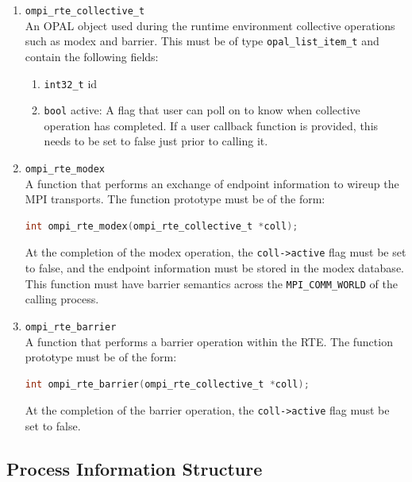 \begin{enumerate}
\item \verb|ompi_rte_collective_t|\\
  An OPAL object used during the runtime environment collective operations such as modex and barrier. This must be of type \verb|opal_list_item_t| and contain the following fields:
  
  \begin{enumerate}
  \item \verb|int32_t| id
  \item \verb|bool| active: A flag that user can poll on to know when collective operation has completed. If a user callback function is provided, this needs to be set to false just prior to calling it.
  \end{enumerate}

\item \verb|ompi_rte_modex|\\
  A function that performs an exchange of endpoint information to wireup the MPI transports. The function prototype must be of the form:
  \begin{lstlisting}[language=C]
  int ompi_rte_modex(ompi_rte_collective_t *coll);
  \end{lstlisting}
  At the completion of the modex operation, the \verb|coll->active| flag must be set to false, and the endpoint information must be stored in the modex database.
  This function must have barrier semantics across the \verb|MPI_COMM_WORLD| of the calling process.

\item \verb|ompi_rte_barrier|\\
  A function that performs a barrier operation within the RTE. The function prototype must be of the form:
  \begin{lstlisting}[language=C]
  int ompi_rte_barrier(ompi_rte_collective_t *coll);
  \end{lstlisting}
  At the completion of the barrier operation, the \verb|coll->active| flag must be set to false.
\end{enumerate}


\subsection{Process Information Structure}

